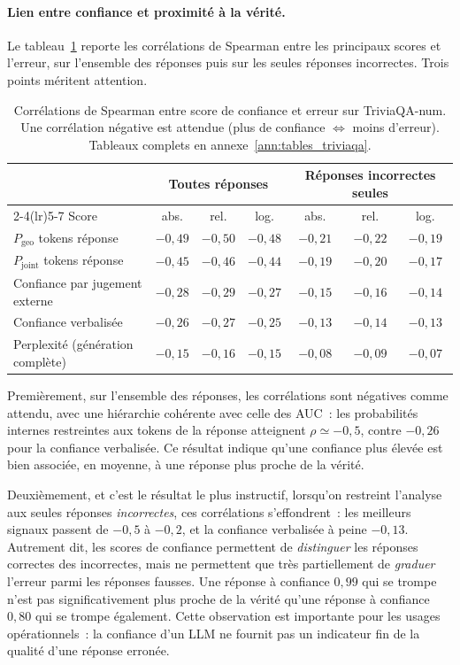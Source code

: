 \documentclass[12pt,a4paper]{article}
\begin{document}
\paragraph{Lien entre confiance et proximité à la vérité.}
Le tableau~\ref{tab:spearman_synthese} reporte les corrélations de Spearman entre les principaux scores et l'erreur, sur l'ensemble des réponses puis sur les seules réponses incorrectes. Trois points méritent attention.

\begin{table}[H]
\centering
\caption{Corrélations de Spearman entre score de confiance et erreur sur TriviaQA-num. Une corrélation négative est attendue (plus de confiance $\Leftrightarrow$ moins d'erreur). Tableaux complets en annexe~\ref{ann:tables_triviaqa}.}
\label{tab:spearman_synthese}
\small
\begin{tabular}{lcccccc}
\toprule
 & \multicolumn{3}{c}{Toutes réponses} & \multicolumn{3}{c}{Réponses incorrectes seules} \\
\cmidrule(lr){2-4}\cmidrule(lr){5-7}
Score & abs. & rel. & log. & abs. & rel. & log. \\
\midrule
$P_{\mathrm{geo}}$ tokens réponse & $-0{,}49$ & $-0{,}50$ & $-0{,}48$ & $-0{,}21$ & $-0{,}22$ & $-0{,}19$ \\
$P_{\mathrm{joint}}$ tokens réponse & $-0{,}45$ & $-0{,}46$ & $-0{,}44$ & $-0{,}19$ & $-0{,}20$ & $-0{,}17$ \\
Confiance par jugement externe & $-0{,}28$ & $-0{,}29$ & $-0{,}27$ & $-0{,}15$ & $-0{,}16$ & $-0{,}14$ \\
Confiance verbalisée & $-0{,}26$ & $-0{,}27$ & $-0{,}25$ & $-0{,}13$ & $-0{,}14$ & $-0{,}13$ \\
Perplexité (génération complète) & $-0{,}15$ & $-0{,}16$ & $-0{,}15$ & $-0{,}08$ & $-0{,}09$ & $-0{,}07$ \\
\bottomrule
\end{tabular}
\end{table}

Premièrement, sur l'ensemble des réponses, les corrélations sont négatives comme attendu, avec une hiérarchie cohérente avec celle des AUC~: les probabilités internes restreintes aux tokens de la réponse atteignent $\rho \simeq -0{,}5$, contre $-0{,}26$ pour la confiance verbalisée. Ce résultat indique qu'une confiance plus élevée est bien associée, en moyenne, à une réponse plus proche de la vérité.

Deuxièmement, et c'est le résultat le plus instructif, lorsqu'on restreint l'analyse aux seules réponses \emph{incorrectes}, ces corrélations s'effondrent~: les meilleurs signaux passent de $-0{,}5$ à $-0{,}2$, et la confiance verbalisée à peine $-0{,}13$. Autrement dit, les scores de confiance permettent de \emph{distinguer} les réponses correctes des incorrectes, mais ne permettent que très partiellement de \emph{graduer} l'erreur parmi les réponses fausses. Une réponse à confiance $0{,}99$ qui se trompe n'est pas significativement plus proche de la vérité qu'une réponse à confiance $0{,}80$ qui se trompe également. Cette observation est importante pour les usages opérationnels~: la confiance d'un LLM ne fournit pas un indicateur fin de la qualité d'une réponse erronée.
\end{document}

